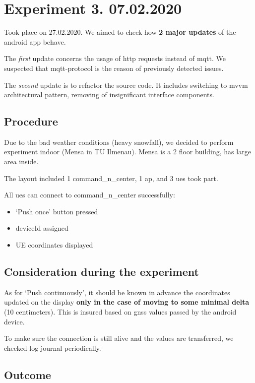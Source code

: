 \section{Experiment 3. 07.02.2020}\label{experiment-3.-07.02.2020}

Took place on 27.02.2020. We aimed to check how \textbf{2 major updates} of the \gls{android} app behave.

The \emph{first} update concerns the usage of \gls{http} requests instead of \gls{mqtt}. We suspected that \gls{mqtt}-protocol is the reason of previously detected issues.

The \emph{second} update is to refactor the source code. It includes switching to \gls{mvvm} architectural pattern, removing of insignificant interface components.

\subsection{Procedure}

Due to the bad weather conditions (heavy snowfall), we decided to perform experiment indoor (Mensa in TU Ilmenau). Mensa is a 2 floor building, has large area inside.

The layout included 1 \gls{command_n_center}, 1 \gls{ap}, and 3 \glspl{ue} took part.

All \glspl{ue} can connect to \gls{command_n_center} successfully:

\begin{itemize}
\tightlist
\item
  `Push once' button pressed
\item
  deviceId assigned
\item
  UE coordinates displayed
\end{itemize}

\subsection{Consideration during the experiment}

As for `Push continuously', it should be known in advance the
coordinates updated on the display \textbf{only in the case of moving to
some minimal delta} (10 centimeters). This is insured based on \gls{gnss} values passed by the \gls{android} device.

To make sure the connection is still alive and the values are transferred, we checked log journal periodically.

\subsection{Outcome}

